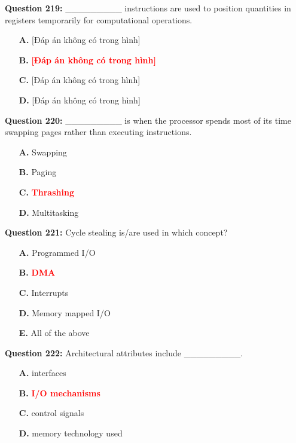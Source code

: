\documentclass[12pt,a4paper]{article}
\begin{document}
\vspace{0.5cm}

\textbf{Question 219:} _________ instructions are used to position quantities in registers temporarily for computational operations.

\begin{itemize}
    \item[\textbf{A.}] [Đáp án không có trong hình]
    \item[\textbf{B.}] \textcolor{red}{\textbf{[Đáp án không có trong hình]}}
    \item[\textbf{C.}] [Đáp án không có trong hình]
    \item[\textbf{D.}] [Đáp án không có trong hình]
\end{itemize}

\vspace{0.5cm}

\textbf{Question 220:} _________ is when the processor spends most of its time swapping pages rather than executing instructions.

\begin{itemize}
    \item[\textbf{A.}] Swapping
    \item[\textbf{B.}] Paging
    \item[\textbf{C.}] \textcolor{red}{\textbf{Thrashing}}
    \item[\textbf{D.}] Multitasking
\end{itemize}

\vspace{0.5cm}

\textbf{Question 221:} Cycle stealing is/are used in which concept?

\begin{itemize}
    \item[\textbf{A.}] Programmed I/O
    \item[\textbf{B.}] \textcolor{red}{\textbf{DMA}}
    \item[\textbf{C.}] Interrupts
    \item[\textbf{D.}] Memory mapped I/O
    \item[\textbf{E.}] All of the above
\end{itemize}

\vspace{0.5cm}

\textbf{Question 222:} Architectural attributes include _________.

\begin{itemize}
    \item[\textbf{A.}] interfaces
    \item[\textbf{B.}] \textcolor{red}{\textbf{I/O mechanisms}}
    \item[\textbf{C.}] control signals
    \item[\textbf{D.}] memory technology used
\end{itemize}
\end{document}
